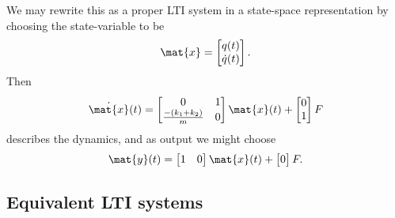 \begin{example}
    We may rewrite this as a proper LTI system in a state-space representation by choosing the state-variable to be
    \begin{equation}
        \mat{x} =
        \begin{bmatrix}
            q(t) \\
            \dot{q}(t)
        \end{bmatrix}.
    \end{equation}
    Then
    \begin{equation}
        \dot{\mat{x}}(t) =
        \begin{bmatrix}
            0                       & 1 \\
            \tfrac{-(k_1 + k_2)}{m} & 0
        \end{bmatrix}
        \mat{x}(t) +
        \begin{bmatrix}
            0 \\
            1
        \end{bmatrix}
        F
    \end{equation}
    describes the dynamics, and as output we might choose
    \begin{equation}
        \mat{y}(t) =
        \begin{bmatrix}
            1 & 0
        \end{bmatrix}
        \mat{x}(t) +
        \begin{bmatrix}
            0
        \end{bmatrix}
        F.
    \end{equation}
\end{example}



\subsection{Equivalent LTI systems}

